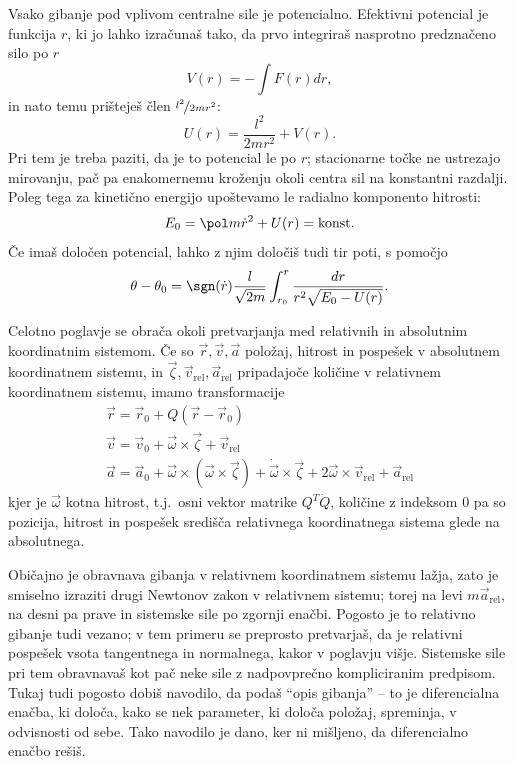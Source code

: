 Vsako gibanje pod vplivom centralne sile je potencialno.
Efektivni potencial je funkcija $r$, ki jo lahko izračunaš tako, da prvo
integriraš nasprotno predznačeno silo po $r$
\[
  V(r) = - \int F(r) dr,
\]
in nato temu prišteješ člen $\nicefrac{l^2}{2 m r^2}$:
\[
  U(r) = \frac{l^2}{2 m r^2} + V(r).
\]
Pri tem je treba paziti, da je to potencial le po $r$; stacionarne točke ne
ustrezajo mirovanju, pač pa enakomernemu kroženju okoli centra sil na konstantni
razdalji.
Poleg tega za kinetično energijo upoštevamo le radialno komponento hitrosti:
\[
  E_0 = \pol m \dot{r}^2 + U(r) = \text{konst}.
\]
Če imaš določen potencial, lahko z njim določiš tudi tir poti, s pomočjo
\[
  \theta - \theta_0 = \sgn(\dot{r}) \frac{l}{\sqrt{2 m}}
  \int_{r_0}^{r} \frac{dr}{r^2 \sqrt{E_0 - U(r)}}.
\]


Celotno poglavje se obrača okoli pretvarjanja med relativnih in absolutnim
koordinatnim sistemom.
Če so $\vec{r}, \vec{v}, \vec{a}$ položaj, hitrost in pospešek v absolutnem
koordinatnem sistemu, in $\vec{\zeta}, \vec{v}_{\text{rel}},
\vec{a}_{\text{rel}}$ pripadajoče količine v relativnem koordinatnem sistemu,
imamo transformacije
\begin{gather*}
  \vec{r} = \vec{r}_0 + Q (\vec{r} - \vec{r}_0) \\
  \vec{v} = \vec{v}_0 + \vec{\omega} \times \vec{\zeta} + \vec{v}_{\text{rel}}
  \\
  \vec{a} = \vec{a}_0 + \vec{\omega} \times (\vec{\omega} \times \vec{\zeta}) +
  \dot{\vec{\omega}} \times \vec{\zeta} + 2 \vec{\omega} \times
  \vec{v}_{\text{rel}} + \vec{a}_{\text{rel}}
\end{gather*}
kjer je $\vec{\omega}$ kotna hitrost, t.j.~osni vektor matrike $Q^T \dot{Q}$,
količine z indeksom $0$ pa so pozicija, hitrost in pospešek središča relativnega
koordinatnega sistema glede na absolutnega.

Običajno je obravnava gibanja v relativnem koordinatnem sistemu lažja, zato je
smiselno izraziti drugi Newtonov zakon v relativnem sistemu; torej na levi $m
\vec{a}_{\text{rel}}$, na desni pa prave in sistemske sile po zgornji enačbi.
Pogosto je to relativno gibanje tudi vezano; v tem primeru se preprosto
pretvarjaš, da je relativni pospešek vsota tangentnega in normalnega, kakor v
poglavju višje.
Sistemske sile pri tem obravnavaš kot pač neke sile z nadpovprečno kompliciranim
predpisom.
Tukaj tudi pogosto dobiš navodilo, da podaš \enquote{opis gibanja} -- to je
diferencialna enačba, ki določa, kako se nek parameter, ki določa položaj,
spreminja, v odvisnosti od sebe.
Tako navodilo je dano, ker ni mišljeno, da diferencialno enačbo rešiš.

